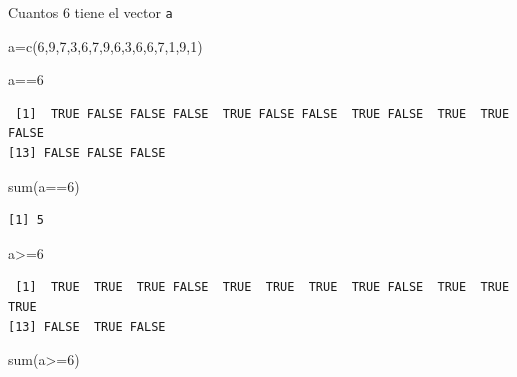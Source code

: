 \documentclass[
  ignorenonframetext,
  aspectratio=169,
  spanish,
]{beamer}
\newenvironment{Shaded}{\begin{snugshade}}{\end{snugshade}}
\newcommand{\DecValTok}[1]{\textcolor[rgb]{0.68,0.00,0.00}{#1}}
\newcommand{\FunctionTok}[1]{\textcolor[rgb]{0.28,0.35,0.67}{#1}}
\newcommand{\NormalTok}[1]{\textcolor[rgb]{0.00,0.23,0.31}{#1}}
\newcommand{\OtherTok}[1]{\textcolor[rgb]{0.00,0.23,0.31}{#1}}
\newcommand{\SpecialCharTok}[1]{\textcolor[rgb]{0.37,0.37,0.37}{#1}}
\begin{document}
\begin{frame}[fragile]{Cuantos 6 tiene el vector \texttt{a}}
\label{cuantos-6-tiene-el-vector-a}
\begin{Shaded}
\begin{Highlighting}[]
\NormalTok{a}\OtherTok{=}\FunctionTok{c}\NormalTok{(}\DecValTok{6}\NormalTok{,}\DecValTok{9}\NormalTok{,}\DecValTok{7}\NormalTok{,}\DecValTok{3}\NormalTok{,}\DecValTok{6}\NormalTok{,}\DecValTok{7}\NormalTok{,}\DecValTok{9}\NormalTok{,}\DecValTok{6}\NormalTok{,}\DecValTok{3}\NormalTok{,}\DecValTok{6}\NormalTok{,}\DecValTok{6}\NormalTok{,}\DecValTok{7}\NormalTok{,}\DecValTok{1}\NormalTok{,}\DecValTok{9}\NormalTok{,}\DecValTok{1}\NormalTok{)}
\end{Highlighting}
\end{Shaded}

\begin{Shaded}
\begin{Highlighting}[]
\NormalTok{a}\SpecialCharTok{==}\DecValTok{6}
\end{Highlighting}
\end{Shaded}

\begin{verbatim}
 [1]  TRUE FALSE FALSE FALSE  TRUE FALSE FALSE  TRUE FALSE  TRUE  TRUE FALSE
[13] FALSE FALSE FALSE
\end{verbatim}

\begin{Shaded}
\begin{Highlighting}[]
\FunctionTok{sum}\NormalTok{(a}\SpecialCharTok{==}\DecValTok{6}\NormalTok{)}
\end{Highlighting}
\end{Shaded}

\begin{verbatim}
[1] 5
\end{verbatim}

\begin{Shaded}
\begin{Highlighting}[]
\NormalTok{a}\SpecialCharTok{\textgreater{}=}\DecValTok{6}
\end{Highlighting}
\end{Shaded}

\begin{verbatim}
 [1]  TRUE  TRUE  TRUE FALSE  TRUE  TRUE  TRUE  TRUE FALSE  TRUE  TRUE  TRUE
[13] FALSE  TRUE FALSE
\end{verbatim}

\begin{Shaded}
\begin{Highlighting}[]
\FunctionTok{sum}\NormalTok{(a}\SpecialCharTok{\textgreater{}=}\DecValTok{6}\NormalTok{)}
\end{Highlighting}
\end{Shaded}


\end{frame}
\end{document}

